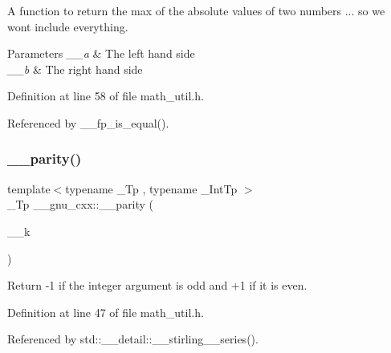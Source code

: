 A function to return the max of the absolute values of two numbers ... so we won\textquotesingle{}t include everything. 
\begin{DoxyParams}{Parameters}
{\em \+\_\+\+\_\+a} & The left hand side \\
\hline
{\em \+\_\+\+\_\+b} & The right hand side \\
\hline
\end{DoxyParams}


Definition at line 58 of file math\+\_\+util.\+h.



Referenced by \+\_\+\+\_\+fp\+\_\+is\+\_\+equal().

\mbox{\label{namespace____gnu__cxx_abc155473831db12736006150c0ad42b6}} 
\subsubsection{\texorpdfstring{\+\_\+\+\_\+parity()}{\_\_parity()}}
{\footnotesize\ttfamily template$<$typename \+\_\+\+Tp , typename \+\_\+\+Int\+Tp $>$ \\
\+\_\+\+Tp \+\_\+\+\_\+gnu\+\_\+cxx\+::\+\_\+\+\_\+parity (\begin{DoxyParamCaption}\item[{\+\_\+\+Int\+Tp}]{\+\_\+\+\_\+k }\end{DoxyParamCaption})\hspace{0.3cm}{\ttfamily [inline]}}

Return -\/1 if the integer argument is odd and +1 if it is even. 

Definition at line 47 of file math\+\_\+util.\+h.



Referenced by std\+::\+\_\+\+\_\+detail\+::\+\_\+\+\_\+stirling\+\_\+\_\+series().

